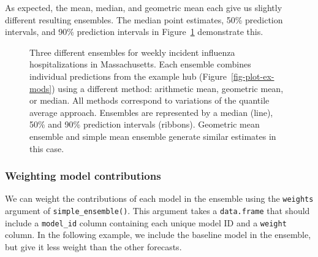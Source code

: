 \documentclass[
  letterpaper,
  DIV=11,
  numbers=noendperiod]{scrartcl}
\begin{document}
As expected, the mean, median, and geometric mean each give us slightly
different resulting ensembles. The median point estimates, 50\%
prediction intervals, and 90\% prediction intervals in
Figure~\ref{fig-plot-ensembles} demonstrate this.

\begin{figure}


\caption{\label{fig-plot-ensembles}Three different ensembles for weekly
incident influenza hospitalizations in Massachusetts. Each ensemble
combines individual predictions from the example hub
(Figure~\ref{fig-plot-ex-mods}) using a different method: arithmetic
mean, geometric mean, or median. All methods correspond to variations of
the quantile average approach. Ensembles are represented by a median
(line), 50\% and 90\% prediction intervals (ribbons). Geometric mean
ensemble and simple mean ensemble generate similar estimates in this
case.}

\end{figure}%

\subsubsection{Weighting model
contributions}\label{weighting-model-contributions}

We can weight the contributions of each model in the ensemble using the
\texttt{weights} argument of \texttt{simple\_ensemble()}. This argument
takes a \texttt{data.frame} that should include a \texttt{model\_id}
column containing each unique model ID and a \texttt{weight} column. In
the following example, we include the baseline model in the ensemble,
but give it less weight than the other forecasts.
\end{document}
